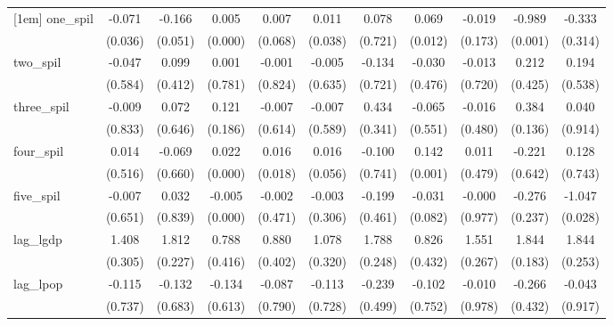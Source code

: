 \begin{tabular}{l*{10}{c}}
[1em]
one\_spil    &      -0.071&      -0.166&       0.005&       0.007&       0.011&       0.078&       0.069&      -0.019&      -0.989&      -0.333\\
            &     (0.036)&     (0.051)&     (0.000)&     (0.068)&     (0.038)&     (0.721)&     (0.012)&     (0.173)&     (0.001)&     (0.314)\\
[1em]
two\_spil    &      -0.047&       0.099&       0.001&      -0.001&      -0.005&      -0.134&      -0.030&      -0.013&       0.212&       0.194\\
            &     (0.584)&     (0.412)&     (0.781)&     (0.824)&     (0.635)&     (0.721)&     (0.476)&     (0.720)&     (0.425)&     (0.538)\\
[1em]
three\_spil  &      -0.009&       0.072&       0.121&      -0.007&      -0.007&       0.434&      -0.065&      -0.016&       0.384&       0.040\\
            &     (0.833)&     (0.646)&     (0.186)&     (0.614)&     (0.589)&     (0.341)&     (0.551)&     (0.480)&     (0.136)&     (0.914)\\
[1em]
four\_spil   &       0.014&      -0.069&       0.022&       0.016&       0.016&      -0.100&       0.142&       0.011&      -0.221&       0.128\\
            &     (0.516)&     (0.660)&     (0.000)&     (0.018)&     (0.056)&     (0.741)&     (0.001)&     (0.479)&     (0.642)&     (0.743)\\
[1em]
five\_spil   &      -0.007&       0.032&      -0.005&      -0.002&      -0.003&      -0.199&      -0.031&      -0.000&      -0.276&      -1.047\\
            &     (0.651)&     (0.839)&     (0.000)&     (0.471)&     (0.306)&     (0.461)&     (0.082)&     (0.977)&     (0.237)&     (0.028)\\
[1em]
lag\_lgdp    &       1.408&       1.812&       0.788&       0.880&       1.078&       1.788&       0.826&       1.551&       1.844&       1.844\\
            &     (0.305)&     (0.227)&     (0.416)&     (0.402)&     (0.320)&     (0.248)&     (0.432)&     (0.267)&     (0.183)&     (0.253)\\
[1em]
lag\_lpop    &      -0.115&      -0.132&      -0.134&      -0.087&      -0.113&      -0.239&      -0.102&      -0.010&      -0.266&      -0.043\\
            &     (0.737)&     (0.683)&     (0.613)&     (0.790)&     (0.728)&     (0.499)&     (0.752)&     (0.978)&     (0.432)&     (0.917)\\

\end{tabular}
